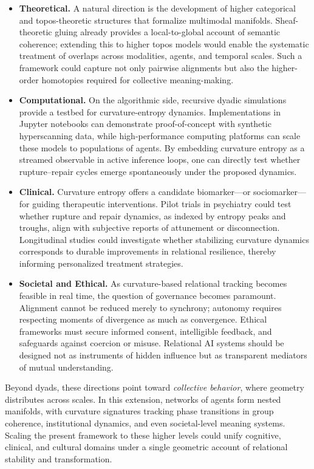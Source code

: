 \documentclass{article}
\theoremstyle{definition}
\begin{document}
\begin{itemize}
  \item \textbf{Theoretical.} A natural direction is the development of higher
  categorical and topos-theoretic structures that formalize multimodal
  manifolds. Sheaf-theoretic gluing already provides a local-to-global account
  of semantic coherence; extending this to higher topos models would enable the
  systematic treatment of overlaps across modalities, agents, and temporal
  scales. Such a framework could capture not only pairwise alignments but also
  the higher-order homotopies required for collective meaning-making.

  \item \textbf{Computational.} On the algorithmic side, recursive dyadic
  simulations provide a testbed for curvature-entropy dynamics. Implementations
  in Jupyter notebooks can demonstrate proof-of-concept with synthetic
  hyperscanning data, while high-performance computing platforms can scale
  these models to populations of agents. By embedding curvature entropy as a
  streamed observable in active inference loops, one can directly test whether
  rupture–repair cycles emerge spontaneously under the proposed dynamics.

  \item \textbf{Clinical.} Curvature entropy offers a candidate biomarker—or
  sociomarker—for guiding therapeutic interventions. Pilot trials in psychiatry
  could test whether rupture and repair dynamics, as indexed by entropy peaks
  and troughs, align with subjective reports of attunement or disconnection.
  Longitudinal studies could investigate whether stabilizing curvature dynamics
  corresponds to durable improvements in relational resilience, thereby
  informing personalized treatment strategies.

  \item \textbf{Societal and Ethical.} As curvature-based relational tracking
  becomes feasible in real time, the question of governance becomes paramount.
  Alignment cannot be reduced merely to synchrony; autonomy requires respecting
  moments of divergence as much as convergence. Ethical frameworks must secure
  informed consent, intelligible feedback, and safeguards against coercion or
  misuse. Relational AI systems should be designed not as instruments of hidden
  influence but as transparent mediators of mutual understanding.
\end{itemize}

Beyond dyads, these directions point toward \emph{collective behavior}, where
geometry distributes across scales. In this extension, networks of agents form
nested manifolds, with curvature signatures tracking phase transitions in group
coherence, institutional dynamics, and even societal-level meaning systems.
Scaling the present framework to these higher levels could unify cognitive,
clinical, and cultural domains under a single geometric account of relational
stability and transformation.
\end{document}
